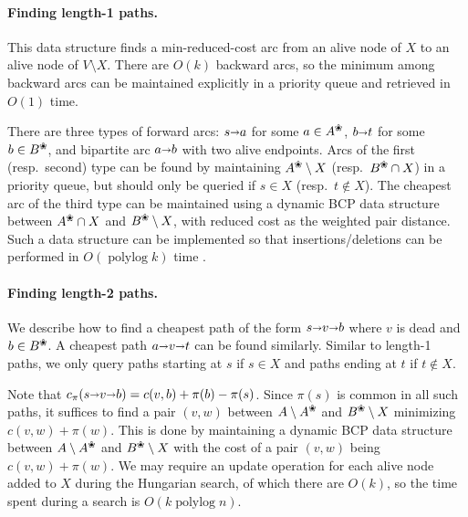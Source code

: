 \documentclass[11pt]{article}
\def\polylog{\mathop{\mathrm{polylog}}}
\def\arcto{\mathord\shortrightarrow}
\def\arc#1#2{#1\arcto#2}
\def\alive#1{{#1}^\text{\ding{96}}}
\def\dead#1{{#1} \setminus \alive{#1}}
\numberwithin{figure}{section}
\begin{document}
\paragraph*{Finding length-1 paths.}
This data structure finds a min-reduced-cost arc from an alive node of
$X$ to an alive node of $V \setminus X$.
There are $O(k)$ backward arcs, so the minimum among backward arcs can be
maintained explicitly in a priority queue and retrieved in $O(1)$ time.

There are three types of forward arcs: $\arc sa$ for some $a \in \alive{A}$,
$\arc bt$ for some $b \in \alive{B}$, and bipartite arc $\arc ab$ with two
alive endpoints.
Arcs of the first (resp.\ second) type can be found by maintaining
$\alive{A} \setminus X$ (resp.\ $\alive{B} \cap X$) in a priority queue,
but should only be queried if $s \in X$ (resp.\ $t \not\in X$).
%
The cheapest arc of the third type can be maintained using a dynamic
BCP data structure between $\alive{A} \cap X$ and $\alive{B} \setminus X$,
with reduced cost as the weighted pair distance.
Such a data structure can be implemented so that insertions/deletions can be
performed in $O(\polylog k)$ time \cite{KMRSS17}.

\paragraph*{Finding length-2 paths.}
We describe how to find a cheapest path of the form $s \arcto v \arcto b$ where
$v$ is dead and $b \in \alive{B}$.
A cheapest path $a \arcto v \arcto t$ can be found similarly.
Similar to length-1 paths, we only query paths starting at $s$ if $s \in X$
and paths ending at $t$ if $t \not\in X$.

Note that $c_\pi(s \arcto v \arcto b) = c(v, b) + \pi(b) - \pi(s)$.
Since $\pi(s)$ is common in all such paths, it suffices to find a pair $(v,w)$ between
$\dead{A}$ and $\alive{B} \setminus X$ minimizing $c(v, w) + \pi(w)$.
This is done by maintaining a dynamic BCP data structure between
$\dead{A}$ and $\alive{B} \setminus X$ with
the cost of a pair $(v, w)$ being $c(v, w) + \pi(w)$.
We may require an update operation for each alive node added to $X$ during the
Hungarian search, of which there are $O(k)$, so the time spent during a search
is $O(k\polylog n)$.
\end{document}
